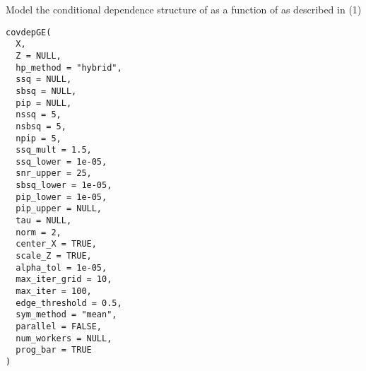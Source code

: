 \documentclass[a4paper]{book}
\begin{document}
%
\begin{Description}\relax
Model the conditional dependence structure of  as a function
of  as described in (1)
\end{Description}
%
\begin{Usage}
\begin{verbatim}
covdepGE(
  X,
  Z = NULL,
  hp_method = "hybrid",
  ssq = NULL,
  sbsq = NULL,
  pip = NULL,
  nssq = 5,
  nsbsq = 5,
  npip = 5,
  ssq_mult = 1.5,
  ssq_lower = 1e-05,
  snr_upper = 25,
  sbsq_lower = 1e-05,
  pip_lower = 1e-05,
  pip_upper = NULL,
  tau = NULL,
  norm = 2,
  center_X = TRUE,
  scale_Z = TRUE,
  alpha_tol = 1e-05,
  max_iter_grid = 10,
  max_iter = 100,
  edge_threshold = 0.5,
  sym_method = "mean",
  parallel = FALSE,
  num_workers = NULL,
  prog_bar = TRUE
)
\end{verbatim}
\end{Usage}
%
\end{document}

